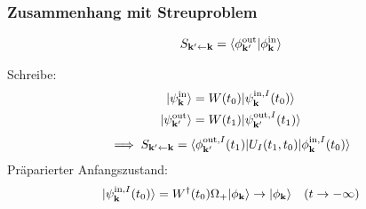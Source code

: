 \documentclass[11pt,a4paper]{report}
\begin{document}
\subsubsection{Zusammenhang mit Streuproblem}
\begin{align*}
    S_{\mathbf{k}' \leftarrow \mathbf{k}} = \langle \phi_{\mathbf{k}'}^{\text{out}}|\phi_{\mathbf{k}}^{\text{in}}\rangle 
\end{align*}

Schreibe: 
\begin{align*}
    |\psi_{\mathbf{k}}^{\text{in}}\rangle &= W(t_0) |\psi_{\mathbf{k}}^{\text{in}, I}(t_0)\rangle \\
    |\psi_{\mathbf{k}'}^{\text{out}}\rangle &= W(t_1) |\psi_{\mathbf{k}'}^{\text{out}, I}(t_1)\rangle
\end{align*}
\begin{align*}
    \implies S_{\mathbf{k}' \leftarrow \mathbf{k}} = \langle \phi_{\mathbf{k}'}^{\text{out},I}(t_1) | U_I(t_1, t_0) |\phi_{\mathbf{k}}^{\text{in},I}(t_0)\rangle 
\end{align*}
Präparierter Anfangszustand:
\begin{align*}
    |\psi_{\mathbf{k}}^{\text{in}, I}(t_0)\rangle = W^\dagger(t_0) \Omega_+ |\phi_{\mathbf{k}}\rangle \rightarrow |\phi_{\mathbf{k}}\rangle \quad (t \rightarrow -\infty)
\end{align*}
\end{document}
